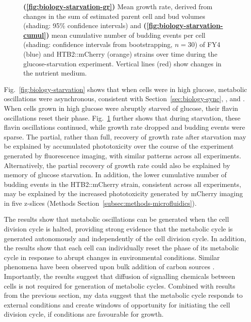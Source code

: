\begin{figure}
  \caption[
    Mean growth rate, derived from changes in the sum of estimated parent cell and bud volumes and
    mean cumulative number of budding events per cell
    of FY4 and HTB2::mCherry strains over time during the glucose-starvation experiment.
  ]{
    \textbf{(\ref{fig:biology-starvation-gr})}
    Mean growth rate, derived from changes in the sum of estimated parent cell and bud volumes (shading: 95\% confidence intervals) and
    \textbf{(\ref{fig:biology-starvation-cumul})}
    mean cumulative number of budding events per cell (shading: confidence intervals from bootstrapping, $n=30$)
    of FY4 (blue) and HTB2::mCherry (orange) strains over time during the glucose-starvation experiment.
    Vertical lines (red) show changes in the nutrient medium.
  }
  \label{fig:biology-starvation-gr-budprob}
\end{figure}

Fig.\ \ref{fig:biology-starvation} shows that when cells were in high glucose, metabolic oscillations were asynchronous, consistent with Section~\ref{sec:biology-sync}, \textcite{papagiannakisAutonomousMetabolicOscillations2017}, and \textcite{baumgartnerFlavinbasedMetabolicCycles2018}.
When cells grown in high glucose were abruptly starved of glucose, their flavin oscillations reset their phase.
Fig.\ \ref{fig:biology-starvation-gr-budprob} further shows that during starvation, these flavin oscillations continued, while growth rate dropped and budding events were sparse.
The partial, rather than full, recovery of growth rate after starvation may be explained by accumulated phototoxicity over the course of the experiment generated by fluorescence imaging, with similar patterns across all experiments.
Alternatively, the partial recovery of growth rate could also be explained by memory of glucose starvation.
In addition, the lower cumulative number of budding events in the HTB2::mCherry strain, consistent across all experiments, may be explained by the increased phototoxicity generated by mCherry imaging in five z-slices (Methods Section~\ref{subsec:methods-microfluidics}).


The results show that metabolic oscillations can be generated when the cell division cycle is halted, providing strong evidence that the metabolic cycle is generated autonomously and independently of the cell division cycle.
In addition, the results show that each cell can individually reset the phase of its metabolic cycle in response to abrupt changes in environmental conditions.
Similar phenomena have been observed upon bulk addition of carbon sources \parencite{kuangMsn2RegulateExpression2017, krishnaMinimalPushPull2018}.
Importantly, the results suggest that diffusion of signalling chemicals between cells is not required for generation of metabolic cycles.
Combined with results from the previous section, my data suggest that the metabolic cycle responds to external conditions and create windows of opportunity for initiating the cell division cycle, if conditions are favourable for growth.


